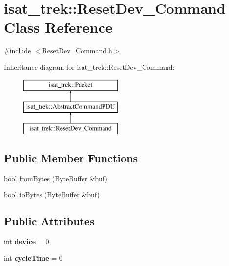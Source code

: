 \hypertarget{classisat__trek_1_1_reset_dev___command}{}\section{isat\+\_\+trek\+:\+:Reset\+Dev\+\_\+\+Command Class Reference}
\label{classisat__trek_1_1_reset_dev___command}


{\ttfamily \#include $<$Reset\+Dev\+\_\+\+Command.\+h$>$}

Inheritance diagram for isat\+\_\+trek\+:\+:Reset\+Dev\+\_\+\+Command\+:\begin{figure}[H]
\begin{center}
\leavevmode
\includegraphics[height=3.000000cm]{classisat__trek_1_1_reset_dev___command}
\end{center}
\end{figure}
\subsection*{Public Member Functions}
\begin{DoxyCompactItemize}
\item 
bool \hyperlink{classisat__trek_1_1_reset_dev___command_a5d86014da142b8de868eff133eb1caef}{from\+Bytes} (Byte\+Buffer \&buf)
\item 
bool \hyperlink{classisat__trek_1_1_reset_dev___command_acbda631f644d4e9edfada832f4d7619c}{to\+Bytes} (Byte\+Buffer \&buf)
\end{DoxyCompactItemize}
\subsection*{Public Attributes}
\begin{DoxyCompactItemize}
\item 
int {\bfseries device} = 0\hypertarget{classisat__trek_1_1_reset_dev___command_ae6fce49cf8031c4d862809dccab9884f}{}\label{classisat__trek_1_1_reset_dev___command_ae6fce49cf8031c4d862809dccab9884f}

\item 
int {\bfseries cycle\+Time} = 0\hypertarget{classisat__trek_1_1_reset_dev___command_a5fcebe9400f435caa5dd63bc3cad94af}{}\label{classisat__trek_1_1_reset_dev___command_a5fcebe9400f435caa5dd63bc3cad94af}

\end{DoxyCompactItemize}


